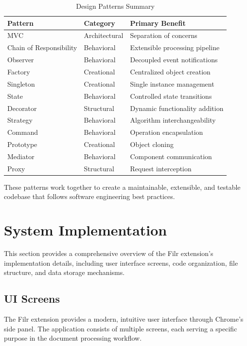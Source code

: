 \documentclass[11pt, a4paper]{article}
\theoremstyle{plain}
\theoremstyle{definition}
\begin{document}
\begin{table}[H]
\centering
\caption{Design Patterns Summary}
\label{tab:patterns-summary}
\begin{tabularx}{\textwidth}{lXl}
\toprule
\textbf{Pattern} & \textbf{Category} & \textbf{Primary Benefit} \\
\midrule
MVC & Architectural & Separation of concerns \\
Chain of Responsibility & Behavioral & Extensible processing pipeline \\
Observer & Behavioral & Decoupled event notifications \\
Factory & Creational & Centralized object creation \\
Singleton & Creational & Single instance management \\
State & Behavioral & Controlled state transitions \\
Decorator & Structural & Dynamic functionality addition \\
Strategy & Behavioral & Algorithm interchangeability \\
Command & Behavioral & Operation encapsulation \\
Prototype & Creational & Object cloning \\
Mediator & Behavioral & Component communication \\
Proxy & Structural & Request interception \\
\bottomrule
\end{tabularx}
\end{table}

These patterns work together to create a maintainable, extensible, and testable codebase that follows software engineering best practices.

\newpage
\section{System Implementation}

This section provides a comprehensive overview of the Filr extension's implementation details, including user interface screens, code organization, file structure, and data storage mechanisms.

\subsection{UI Screens}

The Filr extension provides a modern, intuitive user interface through Chrome's side panel. The application consists of multiple screens, each serving a specific purpose in the document processing workflow.
\end{document}
